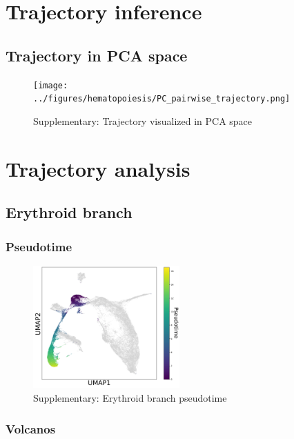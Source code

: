 \documentclass[a4paper]{article}
\begin{document}
\FloatBarrier
\section{Trajectory inference}

\subsection{Trajectory in PCA space}
\begin{figure}[!htb]
  \centering
  \texttt{[image: ../figures/hematopoiesis/PC\_pairwise\_trajectory.png]}
  \caption{Supplementary: Trajectory visualized in PCA space}
\end{figure}


\FloatBarrier
\section{Trajectory analysis}
\subsection{Erythroid branch}

\subsubsection{Pseudotime}
\begin{figure}[!htb]
  \centering
  \includegraphics[width=0.5\textwidth]{../figures/hematopoiesis/Erythroid_40_103_single_branch_pseudotime.png}
  \caption{Supplementary: Erythroid branch pseudotime}
\end{figure}

\FloatBarrier
\subsubsection{Volcanos}
\end{document}
